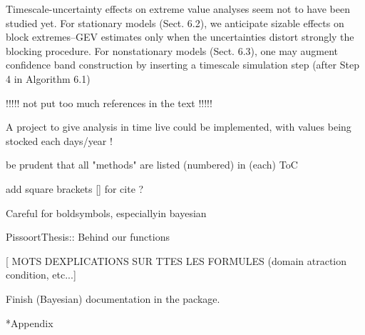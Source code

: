 \documentclass[11pt,a4paper,openany, twosided]{book}
\makeatletter
\renewcommand\part{%
	\if@openright
	\cleardoublepage
	\else
	\clearpage
	\fi
	\thispagestyle{empty}%
	\if@twocolumn
	\onecolumn
	\@tempswatrue
	\else
	\@tempswafalse
	\fi
	\null\vfil
	\secdef\@part\@spart}
\let\origappendix\appendix %
\renewcommand\appendix{\clearpage\pagenumbering{Roman}\origappendix}
\makeatother
\begin{document}
Timescale-uncertainty effects on extreme value analyses seem not to have been
studied yet. For stationary models (Sect. 6.2), we anticipate sizable effects on block
extremes–GEV estimates only when the uncertainties distort strongly the blocking
procedure. For nonstationary models (Sect. 6.3), one may augment confidence band
construction by inserting a timescale simulation step (after Step 4 in Algorithm 6.1) \citet[pp.262]{mudelsee_climate_2014}


!!!!! not put too much references in the text !!!!!

A project to give analysis in time live could be implemented, with values being stocked each days/year !

be prudent that all "methods" are listed (numbered) in (each) ToC

add square brackets [] for cite ? 

Careful for boldsymbols, especiallyin bayesian

PissoortThesis:: Behind our functions 

[ MOTS DEXPLICATIONS SUR TTES LES FORMULES (domain atraction condition, etc...]

\thispagestyle{empty}

Finish (Bayesian) documentation in the package.


{}
\part*{Appendix}
\appendix







\setlength{\parindent}{5em}
\setlength{\parskip}{2em}
\renewcommand{\baselinestretch}{4.0}


\end{document}
